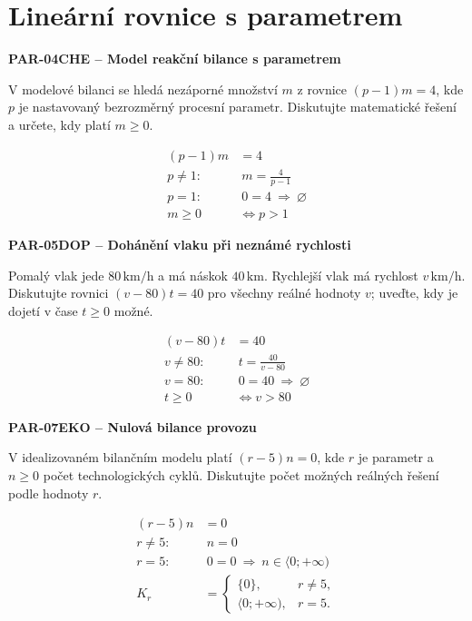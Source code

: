 \documentclass[11pt,a4paper]{article}
\begin{document}
\section{Lineární rovnice s parametrem}
\par\medskip\noindent
\textbf{PAR-04}\quad\textbf{CHE -- Model reakční bilance s parametrem}\par
V modelové bilanci se hledá nezáporné množství $m$ z rovnice $(p-1)m=4$, kde $p$ je nastavovaný bezrozměrný procesní parametr. Diskutujte matematické řešení a určete, kdy platí $m\ge0$.
\par\[\begin{aligned}
(p-1)m&=4\\p\ne1:&\ m=\frac4{p-1}\\p=1:&\ 0=4\ \Rightarrow\ \varnothing\\m\ge0&\iff p>1
\end{aligned}\]
\par\medskip\noindent
\textbf{PAR-05}\quad\textbf{DOP -- Dohánění vlaku při neznámé rychlosti}\par
Pomalý vlak jede $80\,\mathrm{km/h}$ a má náskok $40\,\mathrm{km}$. Rychlejší vlak má rychlost $v\,\mathrm{km/h}$. Diskutujte rovnici $(v-80)t=40$ pro všechny reálné hodnoty $v$; uveďte, kdy je dojetí v čase $t\ge0$ možné.
\par\[\begin{aligned}
(v-80)t&=40\\v\ne80:&\ t=\frac{40}{v-80}\\v=80:&\ 0=40\ \Rightarrow\ \varnothing\\t\ge0&\iff v>80
\end{aligned}\]
\par\medskip\noindent
\textbf{PAR-07}\quad\textbf{EKO -- Nulová bilance provozu}\par
V idealizovaném bilančním modelu platí $(r-5)n=0$, kde $r$ je parametr a $n\ge0$ počet technologických cyklů. Diskutujte počet možných reálných řešení podle hodnoty $r$.
\par\[\begin{aligned}
(r-5)n&=0\\r\ne5:&\ n=0\\r=5:&\ 0=0\ \Rightarrow\ n\in\langle0;+\infty)\\K_r&=\begin{cases}\{0\},&r\ne5,\\\langle0;+\infty),&r=5.\end{cases}
\end{aligned}\]
\par\medskip\noindent
\end{document}
